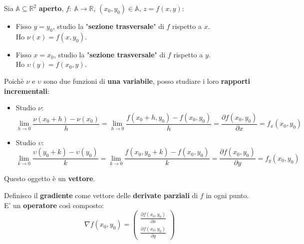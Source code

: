 \documentclass[a4paper, oneside]{article}
\newcommand\R{\mathbb{R}}
\newcommand\A{\mathbb{A}}
\newcommand\de{\partial}
\def\potatoshape{
  (1,0) (2,1.5) (1.6,3) (0.3,2.7) (-0.4,1.2)
}
\newcommand{\potato}[3][draw=white]{
  \begin{scope}[shift={#2}, scale=#3]
    \draw[#1]
      plot [smooth cycle, tension=1]
      coordinates {\potatoshape};
  \end{scope}
}
\begin{document}
    \noindent Sia $\A\subseteq\R^2$ \textbf{aperto}, $f: \ \A\to\R$, $(x_0,y_0)\in\A$, $z=f(x,y)$:\\ 
    \begin{center}
    \end{center}
    \begin{itemize}
        \item Fisso $y=y_0$, studio la "\textbf{sezione trasversale}" di $f$ rispetto a $x$.\\
        Ho $\nu(x) = f(x,y_0)$.
        \item Fisso $x=x_0$, studio la "\textbf{sezione trasversale}" di $f$ rispetto a $y$.\\
        Ho $\upsilon(y) = f(x_0,y)$.
    \end{itemize}

    \noindent Poichè $\nu$ e $\upsilon$ sono due funzioni di \textbf{una variabile}, posso studiare i loro \textbf{rapporti incrementali}:
    \begin{itemize}
        \item Studio $\nu$:
        \[\lim_{h\to 0} \frac{\nu(x_0 + h) - \nu(x_0)}{h} = \lim_{h\to 0} \frac{f(x_0 + h,y_0) - f(x_0,y_0)}{h} = \frac{\de f(x_0,y_0)}{\de x} = f_x (x_0,y_0)\]
        \item Studio $\upsilon$:
        \[\lim_{k\to 0} \frac{\upsilon(y_0 + k) - \upsilon(y_0)}{k} = \lim_{k\to 0} \frac{f(x_0,y_0 + k) - f(x_0,y_0)}{k} = \frac{\de f(x_0,y_0)}{\de y} = f_y (x_0,y_0)\]
    \end{itemize}

    \noindent Questo oggetto è un \textbf{vettore}. 
    \begin{definition}
        Definisco il \textbf{gradiente} come vettore delle \textbf{derivate parziali} di $f$ in ogni punto. E' un \textbf{operatore} così composto:
        \[\nabla f(x_0,y_0) = \begin{pmatrix}
            \frac{\de f(x_0,y_0)}{\de x} \\ \frac{\de f(x_0,y_0)}{\de y}
        \end{pmatrix}\]
    \end{definition}
\end{document}
